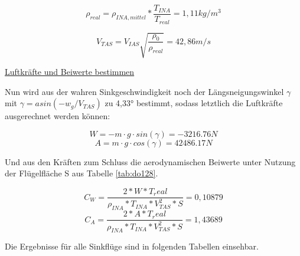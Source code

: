 \vspace{5mm}

\begin{equation}
\rho_{real} = \rho_{INA,mittel} * \frac{T_{INA}}{T_{real}} = 1,11 kg/m^3
\end{equation}

\vspace{5mm}

\begin{equation}
V_{TAS} = V_{IAS}\sqrt{\frac{\rho_0}{\rho_{real}}} =42,86 m/s
\end{equation}


\vspace{5mm} \noindent
\underline{Luftkräfte und Beiwerte bestimmen}

\noindent Nun wird aus der wahren Sinkgeschwindigkeit noch der Längsneigungswinkel $\gamma$ mit $\gamma = asin(-w_g/V_{TAS})$ zu 4,33° bestimmt, sodass letztlich die Luftkräfte ausgerechnet werden können:

\begin{equation}
W = - m\cdot g \cdot sin(\gamma) = -3216.76 N
\end{equation}
\begin{equation}
A = m\cdot g \cdot cos(\gamma) = 42486.17 N
\end{equation}

\vspace{5mm} \noindent
Und aus den Kräften zum Schluss die aerodynamischen Beiwerte unter Nutzung der Flügelfläche S aus Tabelle \ref{tab:do128}.

\begin{equation}
C_W = \frac{2*W*T_real}{\rho_{INA} * T_{INA} * V_{TAS}^2 * S} = 0,10879
\end{equation}
\begin{equation}
C_A = \frac{2*A*T_real}{\rho_{INA} * T_{INA} * V_{TAS}^2 * S} = 1,43689
\end{equation}

\vspace{5mm} \noindent
Die Ergebnisse für alle Sinkflüge sind in folgenden Tabellen einsehbar.

